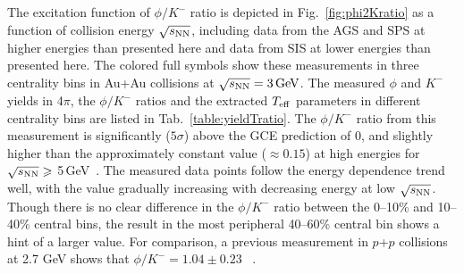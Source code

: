 \documentclass[%
 reprint,	
showpacs,
 amsmath,amssymb,
 aps,
 prc,
]{revtex4-1}
\begin{document}
The excitation function of $\phi/K^-$ ratio is depicted in Fig.~\ref{fig:phi2Kratio} as a function of collision energy $\sqrt{s_{\rm NN}}$, including data from the AGS and SPS at higher energies than presented here and data from SIS at lower energies than presented here. The colored full symbols show these measurements in three centrality bins in Au+Au collisions at ${\sqrt{s_{\rm NN}} = \rm{3\,GeV}}$. The measured $\phi$ and $K^-$ yields in 4$\pi$, the $\phi/K^-$ ratios and the extracted $T_{\rm eff}$ parameters in different centrality bins are listed
in Tab.~\ref{table:yieldTratio}. The $\phi/K^-$ ratio from this measurement is significantly ($5\sigma$) above the GCE prediction of 0, and slightly higher than the approximately constant value ($\approx0.15$) at high energies for $\sqrt{s_{\rm NN}}\geqslant$ 5\,GeV~\cite{NA49_phi,NA49_piK,NA49_piK2,E917_phi,ALICE_phi_2p7TeV,STAR_phi_64a200GeV}. The measured data points follow the energy dependence trend well, with the value gradually increasing with decreasing energy at low $\sqrt{s_{\rm NN}}$. %
Though there is no clear difference in the $\phi/K^-$ ratio between the 0--10\% and 10--40\% central bins, the result in the most peripheral 40--60\% central bin shows a hint of a larger value. For comparison, a previous measurement in $p$+$p$ collisions at 2.7 GeV shows that $\phi/K^- = 1.04\pm0.23$ ~\cite{ANKE_phi}.
\end{document}
